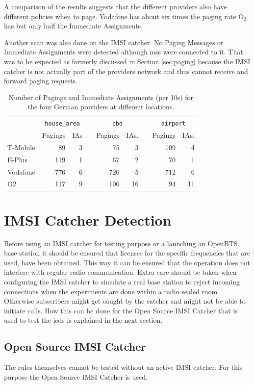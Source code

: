 A comparison of the results suggests that the different providers also have different policies when to page.
Vodafone has about six times the paging rate O$_{2}$ has but only half the Immediate Assignments.

Another scan was also done on the IMSI catcher.
No Paging Messages or Immediate Assignments were detected although \glspl{ms} were connected to it.
That was to be expected as formerly discussed in Section \ref{sec:paging} because the IMSI catcher is not actually part of the providers network and thus cannot receive and forward paging requests.
\begin{table}
\centering
\begin{tabular}{lrrcrrcrr}
\toprule
& \multicolumn{2}{c}{\texttt{house\_area}} &\phantom{a}& \multicolumn{2}{c}{\texttt{cbd}} &\phantom{a} & \multicolumn{2}{c}{\texttt{airport}}\\
\cmidrule{2-3} \cmidrule{5-6} \cmidrule{8-9}
&Pagings&IAs&	&Pagings &IAs.&	&Pagings&IAs.\\
\midrule
T-Mobile&		89&3&	&75&3&	&109&4\\
E-Plus&		119&1&	&67&2&	&70&1\\
Vodafone&		776&6&	&720&5&	&712&6\\
O2&		117&9&	&106&16&	&94&11\\
\bottomrule
\end{tabular}
\caption{Number of Pagings and Immediate Assignments (per 10\;s) for the four German providers at different locations.}
\label{tab:pagings}
\end{table}

\section{IMSI Catcher Detection}
Before using an IMSI catcher for testing purpose or a launching an OpenBTS base station it should be ensured that licenses for the specific frequencies that are used, have been obtained.
This way it can be ensured that the operation does not interfere with regular radio communication.
Extra care should be taken when configuring the IMSI catcher to simulate a real base station to reject incoming connections when the experiments are done within a radio sealed room.
Otherwise subscribers might get caught by the catcher and might not be able to initiate calls.
How this can be done for the Open Source IMSI Catcher that is used to test the \gls{icds} is explained in the next section.

\subsection{Open Source IMSI Catcher}
The rules themselves cannot be tested without an active IMSI catcher.
For this purpose the Open Source IMSI Catcher \cite{dennis} is used.

